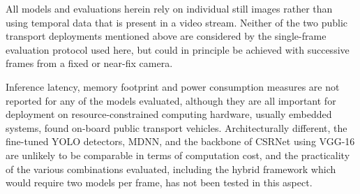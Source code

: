 All models and evaluations herein rely on individual still images rather than using temporal data that is present in a video stream. Neither of the two public transport deployments mentioned above are considered by the single-frame evaluation protocol used here, but could in principle be achieved with successive frames from a fixed or near-fix camera.

Inference latency, memory footprint and power consumption measures are not reported for any of the models evaluated, although they are all important for deployment on resource-constrained computing hardware, usually embedded systems, found on-board public transport vehicles. Architecturally different, the fine-tuned YOLO detectors, MDNN, and the backbone of CSRNet using VGG-16 are unlikely to be comparable in terms of computation cost, and the practicality of the various combinations evaluated, including the hybrid framework which would require two models per frame, has not been tested in this aspect.




